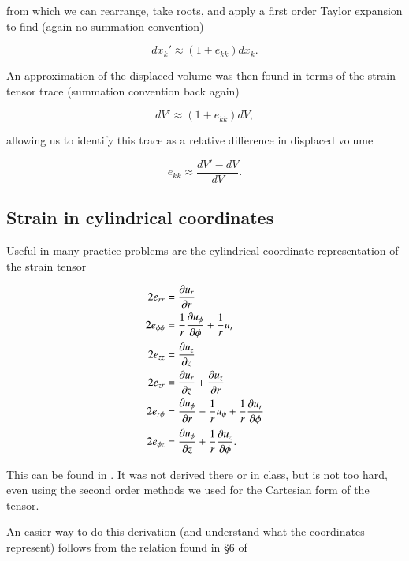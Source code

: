 from which we can rearrange, take roots, and apply a first order Taylor expansion to find (again no summation convention)

\begin{equation}\label{eqn:continuumElasticityReview:150}
dx_k' \approx (1 + e_{kk}) dx_k.
\end{equation}

An approximation of the displaced volume was then found in terms of the strain tensor trace (summation convention back again)

\begin{equation}\label{eqn:continuumElasticityReview:170}
dV' \approx (1 + e_{kk}) dV,
\end{equation}

allowing us to identify this trace as a relative difference in displaced volume

\begin{equation}\label{eqn:continuumElasticityReview:190}
e_{kk} \approx \frac{dV' - dV}{dV}.
\end{equation}

\subsection{Strain in cylindrical coordinates}

Useful in many practice problems are the cylindrical coordinate representation of the strain tensor 

\begin{align}\label{eqn:continuumElasticityReview:210}
2 e_{rr} &= \PD{r}{u_r}  \\
2 e_{\phi\phi} &= \inv{r} \PD{\phi}{u_\phi} +\inv{r} u_r  \\
2 e_{zz} &= \PD{z}{u_z}  \\
2 e_{zr} &= \PD{z}{u_r} + \PD{r}{u_z} \\
2 e_{r\phi} &= \PD{r}{u_\phi} - \inv{r} u_\phi + \inv{r} \PD{\phi}{u_r} \\
2 e_{\phi z} &= \PD{z}{u_\phi} +\inv{r} \PD{\phi}{u_z}.
\end{align}

This can be found in \cite{landau1960theory}.  It was not derived there or in class, but is not too hard, even using the second order methods we used for the Cartesian form of the tensor.

An easier way to do this derivation (and understand what the coordinates represent) follows from the relation found in \S 6 of \cite{acheson1990elementary}

